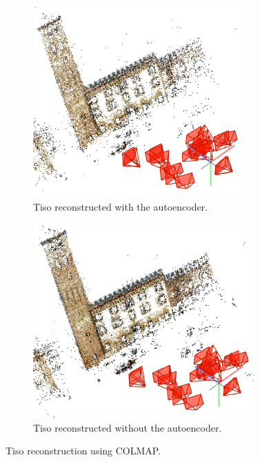 \begin{figure}[H]
     \centering
          \begin{subfigure}[b]{0.5\textwidth}
		\centering
    		\includegraphics[width=\textwidth]{images/tisoautoenc.png}
		\caption{\centering Tiso reconstructed with the autoencoder.}
		\label{fig:tisoautoenc}   
     \end{subfigure}
     \hfill
     \begin{subfigure}[b]{.49\textwidth}
		\centering
		\includegraphics[width=\textwidth]{images/tisotrue.png}  
		\caption{\centering Tiso reconstructed without the autoencoder.}
	    	\label{fig:tisotrue} 
     \end{subfigure}
        \caption{Tiso reconstruction using COLMAP.}
        \label{fig:Tiso3D}
\end{figure}


